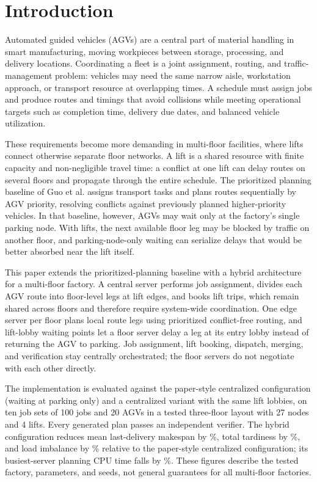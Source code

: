 \section{Introduction}
\label{sec:intro}

Automated guided vehicles (AGVs) are a central part of material handling in smart manufacturing, moving workpieces between storage, processing, and delivery locations. Coordinating a fleet is a joint assignment, routing, and traffic-management problem: vehicles may need the same narrow aisle, workstation approach, or transport resource at overlapping times. A schedule must assign jobs and produce routes and timings that avoid collisions while meeting operational targets such as completion time, delivery due dates, and balanced vehicle utilization.

These requirements become more demanding in multi-floor facilities, where lifts connect otherwise separate floor networks. A lift is a shared resource with finite capacity and non-negligible travel time: a conflict at one lift can delay routes on several floors and propagate through the entire schedule. The prioritized planning baseline of Guo et al. \cite{guo2024} assigns transport tasks and plans routes sequentially by AGV priority, resolving conflicts against previously planned higher-priority vehicles. In that baseline, however, AGVs may wait only at the factory's single parking node. With lifts, the next available floor leg may be blocked by traffic on another floor, and parking-node-only waiting can serialize delays that would be better absorbed near the lift itself.

This paper extends the prioritized-planning baseline with a hybrid architecture for a multi-floor factory. A central server performs job assignment, divides each AGV route into floor-level legs at lift edges, and books lift trips, which remain shared across floors and therefore require system-wide coordination. One edge server per floor plans local route legs using prioritized conflict-free routing, and lift-lobby waiting points let a floor server delay a leg at its entry lobby instead of returning the AGV to parking. Job assignment, lift booking, dispatch, merging, and verification stay centrally orchestrated; the floor servers do not negotiate with each other directly.

The implementation is evaluated against the paper-style centralized configuration (waiting at parking only) and a centralized variant with the same lift lobbies, on ten job sets of 100 jobs and 20 AGVs in a tested three-floor layout with 27 nodes and 4 lifts. Every generated plan passes an independent verifier. The hybrid configuration reduces mean last-delivery makespan by \RedMakespanCAabs\%, total tardiness by \RedTardinessCAabs\%, and load imbalance by \RedImbalanceCAabs\% relative to the paper-style centralized configuration; its busiest-server planning CPU time falls by \RedCpuMaxCAabs\%. These figures describe the tested factory, parameters, and seeds, not general guarantees for all multi-floor factories.

